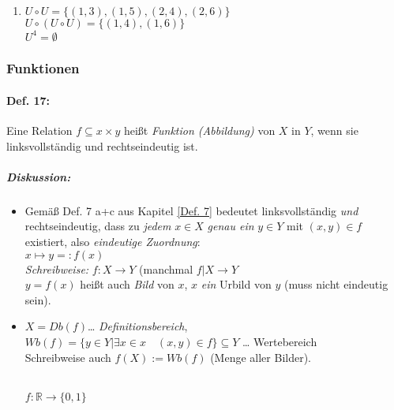 \begin{enumerate}
\begin{enumerate}   [label=\alph*)]
\item $U\circ U=\{(1,3), (1,5), (2,4), (2,6)\}$\\
$U\circ (U \circ U)=\{ (1,4), (1,6)\}$\\
$U^4=\emptyset$
\end{enumerate}
\end{enumerate}

\subsubsection{Funktionen}

\paragraph{Def. 17:} \parskp
Eine Relation $f\subseteq x\times y$ heißt \emph{Funktion (Abbildung)} von $X$ in $Y$, wenn sie linksvollständig und rechtseindeutig ist.

\subparagraph{Diskussion:}
\begin{itemize}
\item Gemäß Def. 7 a+c aus Kapitel \ref{Def. 7} bedeutet linksvollständig \emph{und} rechtseindeutig, dass zu \emph{jedem} $x\in X$ \emph{genau ein} $y \in Y$ mit $(x,y) \in f$ existiert, also \emph{eindeutige Zuordnung}:\\
$\boxed{x\longmapsto y=: f(x)}$\\
\emph{Schreibweise:}
$f: X \rightarrow Y$ (manchmal $f|X\rightarrow Y$\\
$y=f(x)$ heißt auch \emph{Bild} von $x$, $x$ \emph{ein} Urbild von $y$ (muss nicht eindeutig sein).
\item $X=Db(f)$… \emph{Definitionsbereich}, \\
$Wb(f)=\{y \in Y | \exists x \in x \quad (x,y) \in f\} \subseteq Y$ … Wertebereich\\
Schreibweise auch $f(X):= Wb (f)$ (Menge aller Bilder).\\
\\
$f: \mathbb{R} \rightarrow \{0,1\}$
\end{itemize}

